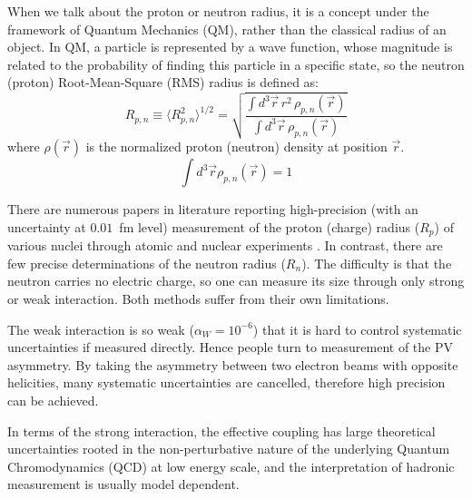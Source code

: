 When we talk about the proton or neutron radius, it is a concept under the
framework of Quantum Mechanics (QM), rather than the classical radius of an object.
In QM, a particle is represented by a wave function, 
whose magnitude is related to the probability of finding this particle in a specific
state, so the neutron (proton) Root-Mean-Square (RMS) radius is defined as:
\begin{equation}
    R_{p, n} \equiv \langle R_{p,n}^2\rangle^{1/2} = \sqrt{\frac{\int d^3\vec{r}\,r^2\,\rho_{p,n}(\vec{r})}{\int d^3\vec{r}\,\rho_{p,n}(\vec{r})}}
    \label{eq:nucleon_rms_radius}
\end{equation}
where $\rho(\vec{r})$ is the normalized proton (neutron) density at position $\vec{r}$.
\begin{equation}
    \int d^3\vec{r} \rho_{p, n}(\vec{r}) = 1 
\end{equation}

There are numerous papers in literature reporting high-precision  
(with an uncertainty at $0.01$~fm level)
measurement of the proton (charge) radius ($R_p$) of various nuclei through atomic 
and nuclear experiments \cite{DEVRIES1987495, ANGELI201369}. In contrast, there
are few precise determinations of the neutron radius ($R_n$). The difficulty is that
the neutron carries no electric charge, so one can measure its size through only 
strong or weak interaction. Both methods suffer from their own limitations. 

The weak interaction is so weak ($\alpha_W = 10^{-6}$) that it is hard to control 
systematic uncertainties if measured directly.
Hence people turn to measurement of the PV asymmetry. By taking the asymmetry
between two electron beams with opposite helicities, many systematic uncertainties
are cancelled, therefore high precision can be achieved.

In terms of the strong interaction, the effective coupling has large theoretical uncertainties rooted 
in the non-perturbative nature of the underlying Quantum Chromodynamics (QCD) at low energy scale, 
and the interpretation of hadronic measurement is usually model dependent. 

